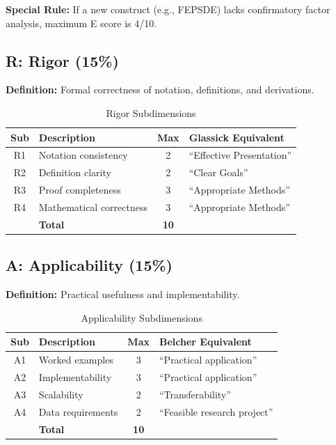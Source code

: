 \documentclass[11pt,a4paper]{article}
\begin{document}
\textbf{Special Rule:} If a new construct (e.g., FEPSDE) lacks confirmatory factor analysis, maximum E score is 4/10.

\subsection{R: Rigor (15\%)}

\textbf{Definition:} Formal correctness of notation, definitions, and derivations.

\begin{table}[h]
\centering
\caption{Rigor Subdimensions}
\begin{tabular}{clcp{6cm}}
\toprule
\textbf{Sub} & \textbf{Description} & \textbf{Max} & \textbf{Glassick Equivalent} \\
\midrule
R1 & Notation consistency & 2 & ``Effective Presentation'' \\
R2 & Definition clarity & 2 & ``Clear Goals'' \\
R3 & Proof completeness & 3 & ``Appropriate Methods'' \\
R4 & Mathematical correctness & 3 & ``Appropriate Methods'' \\
\midrule
& \textbf{Total} & \textbf{10} & \\
\bottomrule
\end{tabular}
\end{table}

\subsection{A: Applicability (15\%)}

\textbf{Definition:} Practical usefulness and implementability.

\begin{table}[h]
\centering
\caption{Applicability Subdimensions}
\begin{tabular}{clcp{6cm}}
\toprule
\textbf{Sub} & \textbf{Description} & \textbf{Max} & \textbf{Belcher Equivalent} \\
\midrule
A1 & Worked examples & 3 & ``Practical application'' \\
A2 & Implementability & 3 & ``Practical application'' \\
A3 & Scalability & 2 & ``Transferability'' \\
A4 & Data requirements & 2 & ``Feasible research project'' \\
\midrule
& \textbf{Total} & \textbf{10} & \\
\bottomrule
\end{tabular}
\end{table}
\end{document}
